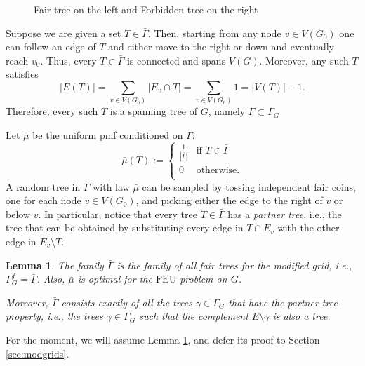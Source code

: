 \documentclass[preprint,12pt]{elsarticle}
\newtheorem{lemma}[theorem]{Lemma}
\theoremstyle{definition}
\theoremstyle{remark}
\numberwithin{equation}{section}
\newcommand{\ga}{\gamma }
\newcommand{\Ga}{\Gamma }
\begin{document}
\begin{figure}[h!]
  
\caption{Fair tree on the left and Forbidden tree on the right}
 \label{fig:grid-trees}
 \end{figure}


Suppose we are given a set $T\in\bar{\Ga}$. Then, starting from any node $v\in V(G_0)$ one can follow an edge of $T$ and either move to the right or down and eventually reach $v_0$. Thus, every $T \in \bar{\Gamma}$ is connected and spans $V(G)$.
Moreover, any such $T$ satisfies
\begin{equation} \label{eq:edgecount}
|E(T)|=\sum_{v \in V(G_0)} |E_{v} \cap T|=\sum_{v \in V(G_0)} 1= |V(T)|-1.
\end{equation} 
Therefore, every such $T$ is a spanning tree of $G$, namely $\bar{\Gamma} \subset \Gamma_G$

Let $\bar{\mu}$ be the uniform pmf conditioned  on $\bar{\Gamma}$:
\[ \bar{\mu}(T):= \begin{cases} 
      \frac{1}{\left|\bar{\Gamma}\right|} &  \text{if $T \in \bar{\Gamma}$} \\
      0 & \text{otherwise}.\\
      
   \end{cases}
\]
A random tree in $\bar{\Gamma}$ with law $\bar{\mu}$ can be sampled by tossing independent  fair coins, one for each node  $v\in V(G_0)$, and picking either the edge to the right of $v$ or below $v$. In particular, notice that every tree $T\in \bar{\Gamma}$ has a  {\it partner tree}, i.e., the tree that can be obtained by substituting  every edge in $T\cap E_v$ with the other edge in $E_v\setminus T$.

\begin{lemma}\label{lem:fairtree-modgrid}
The family $\bar{\Ga}$ is the family of all fair trees for the modified grid, i.e., 
$\Gamma^f_G=\bar{\Gamma}$. Also,  $\bar{\mu}$  is optimal for the $\text{FEU}$ problem on $G$.

Moreover, $\bar{\Ga}$ consists exactly of all the trees $\ga\in\Gamma_G$ that have the {\it partner tree property}, i.e., the trees $\ga\in\Ga_G$ such that the complement $E\setminus \ga$ is also a tree.
\end{lemma}
For the moment, we will assume Lemma \ref{lem:fairtree-modgrid}, and defer its proof to Section \ref{sec:modgrids}.
\end{document}
